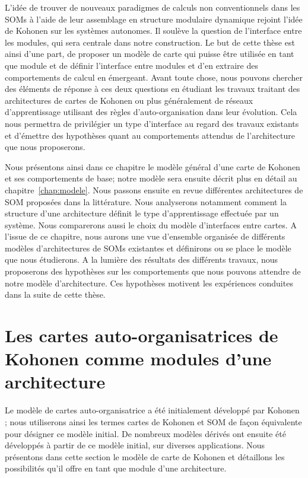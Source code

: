 \documentclass[../main]{subfiles}
\begin{document}
L'idée de trouver de nouveaux paradigmes de calculs non conventionnels dans les SOMs à l'aide de leur assemblage en structure modulaire dynamique rejoint l'idée de Kohonen sur les systèmes autonomes. 
Il soulève la question de l'interface entre les modules, qui sera centrale dans notre construction. 
Le but de cette thèse est ainsi d'une part, de proposer un modèle de carte qui puisse être utilisée en tant que module et de définir l'interface entre modules et d'en extraire des comportements de calcul en émergeant. 
Avant toute chose, nous pouvons chercher des éléments de réponse à ces deux questions en étudiant les travaux traitant des architectures de cartes de Kohonen ou plus généralement de réseaux d'apprentissage utilisant des règles d'auto-organisation dans leur évolution. Cela nous permettra de privilégier un type d'interface au regard des travaux existants et d'émettre des hypothèses quant au comportements attendus de l'architecture que nous proposerons.

Nous présentons ainsi dans ce chapitre le modèle général d'une carte de Kohonen et ses comportements de base; notre modèle sera ensuite décrit plus en détail au chapitre~\ref{chap:modele}.
Nous passons ensuite en revue différentes architectures de SOM proposées dans la littérature. 
Nous analyserons notamment comment la structure d'une architecture définit le type d'apprentissage effectuée par un système. Nous comparerons aussi le choix du modèle d'interfaces entre cartes.
A l'issue de ce chapitre, nous aurons une vue d'ensemble organisée de différents modèles d'architectures de SOMs existantes et définirons ou se place le modèle que nous étudierons.
A la lumière des résultats des différents travaux, nous proposerons des hypothèses sur les comportements que nous pouvons attendre de notre modèle d'architecture. 
Ces hypothèses motivent les expériences conduites dans la suite de cette thèse. 

\section{Les cartes auto-organisatrices de Kohonen comme modules d'une architecture}\label{sec:som001}

Le modèle de cartes auto-organisatrice a été initialement développé par Kohonen \cite{Kohonen1982}; nous utiliserons ainsi les termes cartes de Kohonen et SOM de façon équivalente pour désigner ce modèle initial.
De nombreux modèles dérivés ont ensuite été développés à partir de ce modèle initial, sur diverses applications.
Nous présentons dans cette section le modèle de carte de Kohonen et détaillons les possibilités qu'il offre en tant que module d'une architecture. 
\end{document}
